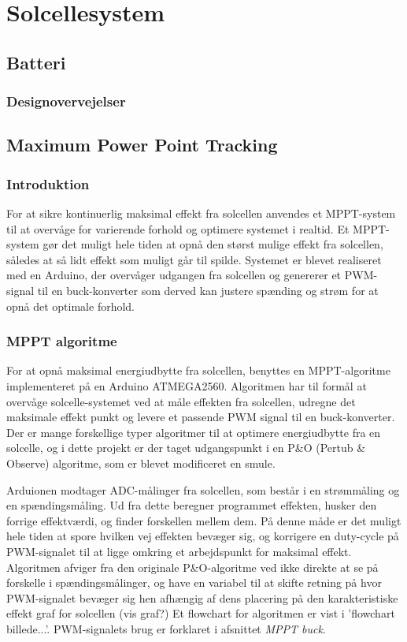 \documentclass[../main.tex]{subfiles}
\begin{document}
\chapter{Solcellesystem} \label{Chap:Solcellesystem}

\section{Batteri}

    \subsection{Designovervejelser}

\section{Maximum Power Point Tracking}

    \subsection{Introduktion}

For at sikre kontinuerlig maksimal effekt fra solcellen anvendes et MPPT-system til at overvåge for varierende forhold og optimere systemet i realtid. Et MPPT-system gør det muligt hele tiden at opnå den størst mulige effekt fra solcellen, således at så lidt effekt som muligt går til spilde. Systemet er blevet realiseret med en Arduino, der overvåger udgangen fra solcellen og genererer et PWM-signal til en buck-konverter som derved kan justere spænding og strøm for at opnå det optimale forhold. 

    \subsection{MPPT algoritme}

    For at opnå maksimal energiudbytte fra solcellen, benyttes en MPPT-algoritme implementeret på en Arduino ATMEGA2560. Algoritmen har til formål at overvåge solcelle-systemet ved at måle effekten fra solcellen, udregne det maksimale effekt punkt og levere et passende PWM signal til en buck-konverter. Der er mange forskellige typer algoritmer til at optimere energiudbytte fra en solcelle, og i dette projekt er der taget udgangspunkt i en P\&O (Pertub \& Observe) algoritme, som er blevet modificeret en smule. 
    
    Arduionen modtager ADC-målinger fra solcellen, som består i en strømmåling og en spændingsmåling. Ud fra dette beregner programmet effekten, husker den forrige effektværdi, og finder forskellen mellem dem. På denne måde er det muligt hele tiden at spore hvilken vej effekten bevæger sig, og korrigere en duty-cycle på PWM-signalet til at ligge omkring et arbejdspunkt for maksimal effekt. Algoritmen afviger fra den originale P&O-algoritme ved ikke direkte at se på forskelle i spændingsmålinger, og have en variabel til at skifte retning på hvor PWM-signalet bevæger sig hen afhængig af dens placering på den karakteristiske effekt graf for solcellen (vis graf?) Et flowchart for algoritmen er vist i 'flowchart billede...'. 
    PWM-signalets brug er forklaret i afsnittet \textit{MPPT buck}.
\end{document}
